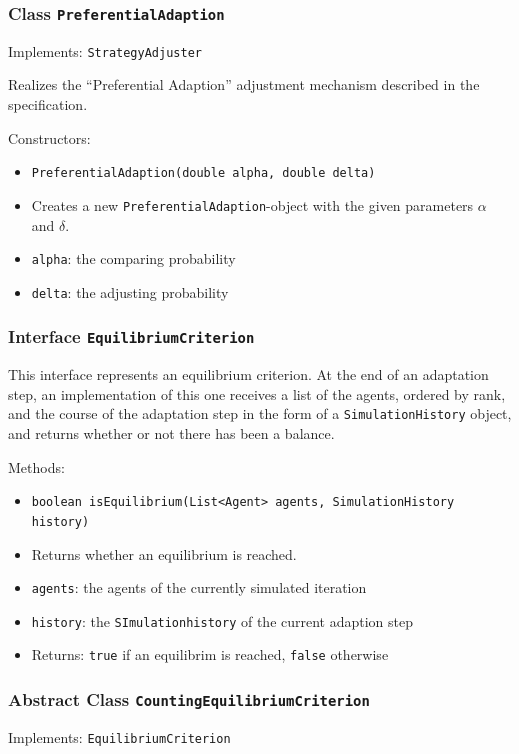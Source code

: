 \documentclass[parskip=full,11pt]{scrartcl}
\begin{document}
\subsubsection{Class \texttt{PreferentialAdaption}}
Implements: \texttt{StrategyAdjuster}

Realizes the \enquote{Preferential Adaption} adjustment mechanism described in the specification.

Constructors:
\begin{itemize}\itemsep -10pt
\item \texttt{PreferentialAdaption(double alpha, double delta)}
\item[] Creates a new \texttt{PreferentialAdaption}-object with the given parameters \(\alpha\) and \(\delta\).
\item[] \texttt{alpha}: the comparing probability
\item[] \texttt{delta}: the adjusting probability
\end{itemize}

\subsubsection{Interface \texttt{EquilibriumCriterion}}

This interface represents an equilibrium criterion. At the end of an adaptation step, an implementation of this one receives a list of the agents, ordered by rank, and the course of the adaptation step in the form of a \texttt{SimulationHistory} object, and returns whether or not there has been a balance.

Methods:
\begin{itemize}\itemsep -10pt
\item \texttt{boolean isEquilibrium(List<Agent> agents, SimulationHistory history)}
\item[] Returns whether an equilibrium is reached.
\item[] \texttt{agents}: the agents of the currently simulated iteration
\item[] \texttt{history}: the \texttt{SImulationhistory} of the current adaption step
\item[] Returns: \texttt{true} if an equilibrim is reached, \texttt{false} otherwise
\end{itemize}

\subsubsection{Abstract Class \texttt{CountingEquilibriumCriterion}}
Implements: \texttt{EquilibriumCriterion}
\end{document}
